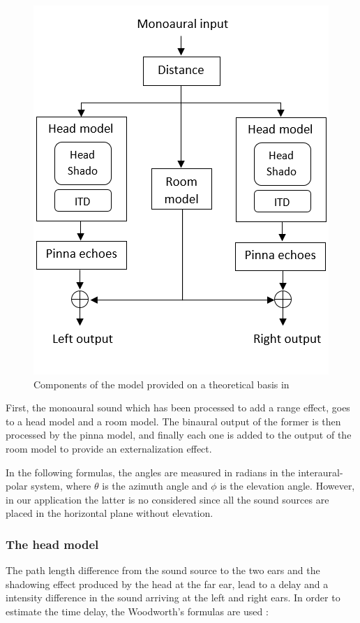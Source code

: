 \documentclass[journal]{IEEEtran}
\begin{document}
\begin{figure}
	\centering
		\includegraphics[scale=0.75]{graphics/graphic.png}
	\caption{Components of the model provided on a theoretical basis in \citep{Brown1997}}
	\label{fig:workflow}
\end{figure}


First, the monoaural sound which has been processed to add a range effect, goes to a head model and a room model. The binaural output of the former is then processed by the pinna model, and finally each one is added to the output of the room model to provide an externalization effect.

In the following formulas, the angles are measured in radians in the interaural-polar system, where $\theta$ is the azimuth angle and $\phi$ is the elevation angle. However, in our application the latter is no considered since all the sound sources are placed in the horizontal plane without elevation.


\subsubsection{The head model}

The path length difference from the sound source to the two ears and the shadowing effect produced by the head at the far ear, lead to a delay and a intensity difference in the sound arriving at the left and right ears. In order to estimate the time delay, the Woodworth's formulas are used \citep{Woodworth} :
\end{document}
